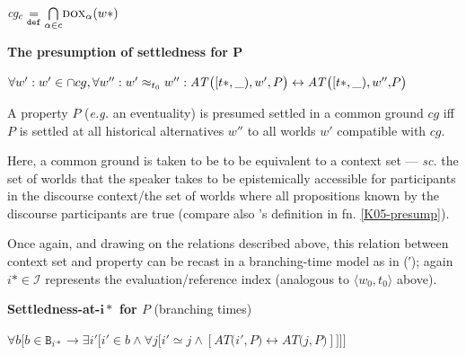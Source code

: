 \documentclass[12pt,dvipsnames]{report}
\begin{document}
\textit{cg}$ _c \underset{\texttt{def}}{=}  \underset{\alpha\in c}{\bigcap} \textsc{dox}_\alpha (w*) $


\a \textbf{The presumption of settledness for $\boldsymbol P$}


$\forall w^\prime:w^\prime\in\cap cg,\forall w^{\prime\prime}:w^\prime\approx_{t_0}w^{\prime\prime}:\\\mathit{AT}\big([t*,\_),w^\prime, P\big)\leftrightarrow \mathit{AT}\big([t*,\_),w^{\prime\prime},\!P\big)$\hspace*{\fill}\citep[82]{Condoravdi2002}\vspace{.25cm}

A property $P$ (\textit{e.g.} an eventuality) is presumed settled in a common ground $cg$ iff $P$ is settled at all historical alternatives $ w'' $ to all worlds $ w' $ compatible with $ cg $.

Here, a common ground is taken to be to be equivalent to a context set \citep[$ \cap\textit{cg} $, \textit{cf.}][321\textit{ff}]{Stalnaker1978} --- \textit{sc. }the set of worlds that the speaker takes to be epistemically accessible for participants in the discourse context/the set of worlds where all propositions known by the discourse participants are true (compare also \citeauthor{Kaufmann2005}'s definition in fn. \ref{K05-presump}).
\xe

Once again, and drawing on the relations described above, this relation between context set and property can be recast in a branching-time model as in (′); again $ i*\in\mathcal I $ represents the evaluation/reference index (analogous to $ \langle w_0,t_0\rangle $ above).

\pex[exno=\getref{HistNec}′]\textbf{Settledness-at-$ \boldsymbol{i*} $ for $ \boldsymbol{\mathit P} $} (branching times)




\nobreak$\forall b\bigg[b\in\texttt{B}_{i*}\to\exists i'\Big[i'\in b\wedge\forall j\big[i'\simeq j\wedge[\mathit{AT}\big(i', \mathit{P}\big)\leftrightarrow \mathit{AT}\big(j,\mathit{P}\big)]\big]\Big]\bigg]$
\end{document}

